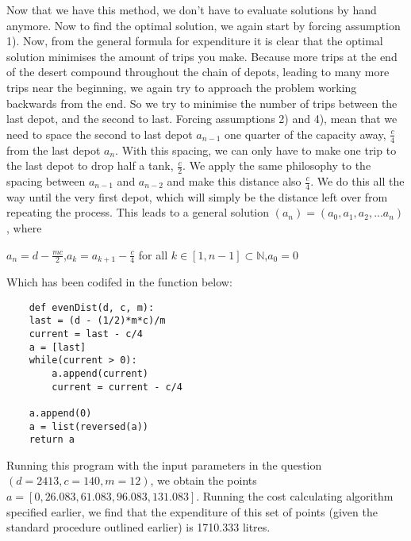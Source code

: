 \documentclass{homework}
\newcommand*{\N}{\mathbb N}
\begin{document}
Now that we have this method, we don't have to evaluate solutions by hand anymore.
\newline\newline
Now to find the optimal solution, we again start by forcing assumption 1). Now, from the general formula for expenditure it is clear that the optimal solution minimises the amount of trips you make. Because more trips at the end of the desert compound throughout the chain of depots, leading to many more trips near the beginning, we again try to approach the problem working backwards from the end. So we try to minimise the number of trips between the last depot, and the second to last. Forcing assumptions 2) and 4), mean that we need to space the second to last depot $a_{n-1}$ one quarter of the capacity away, $\frac{c}{4}$ from the last depot $a_n$. With this spacing, we can only have to make one trip to the last depot to drop half a tank, $\frac{c}{2}$. We apply the same philosophy to the spacing between $a_{n-1}$ and $a_{n-2}$ and make this distance also $\frac{c}{4}$. We do this all the way until the very first depot, which will simply be the distance left over from repeating the process.
\newline\newline
This leads to a general solution $(a_n) = (a_0, a_1, a_2, ... a_n)$, where
\newline\begin{center}
$a_n = d - \frac{mc}{2}$,\quad$a_{k} = a_{k+1} - \frac{c}{4}$ for all $k \in [1, n-1] \subset \N$,\quad$a_0 = 0$
\end{center}
Which has been codifed in the function below:
\begin{lstlisting}
    def evenDist(d, c, m):
    last = (d - (1/2)*m*c)/m
    current = last - c/4
    a = [last]
    while(current > 0):
        a.append(current)
        current = current - c/4

    a.append(0)
    a = list(reversed(a))
    return a

\end{lstlisting}
Running this program with the input parameters in the question $(d=2413, c=140, m=12)$, we obtain the points $a = [0, 26.083, 61.083, 96.083, 131.083]$. Running the cost calculating algorithm specified earlier, we find that the expenditure of this set of points (given the standard procedure outlined earlier) is 1710.333 litres.
\end{document}
